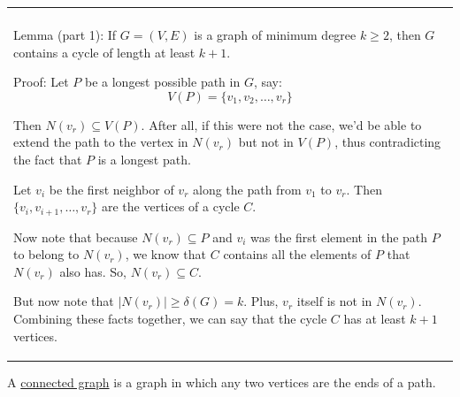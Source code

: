 \documentclass{book}
\newcommand{\hOneOld}{%
   \color{Black}%
   \fontsize{14}{14}\selectfont%
}
\newcommand{\exOneOldd}{%
   \color{Purple}%
   \fontsize{14}{14}\selectfont%
}
\newcommand{\exPOldd}{%
   \color{VioletRed}%
   \fontsize{12}{12}\selectfont%
}
\newenvironment{myConstrict}{%
   \begin{adjustwidth}{2.5em}{2.5em}%
}{%
   \end{adjustwidth}%
}
\newcommand{\udefine}[1]{{%
   \setulcolor{Red}%
   \setul{0.14em}{0.07em}%
   \ul{#1}%
}}
\newcommand{\uuline}[2][.]{%
{\vphantom{a}\color{#1}%
\rlap{\rule[-0.18em]{\widthof{#2}}{0.06em}}%
\rlap{\rule[-0.32em]{\widthof{#2}}{0.06em}}}%
#2}
\newenvironment{myClosureOne}[2][.]{%
   \color{#1}%
   \begin{tabular}{|p{#2in}|} \hline \\%
}{%
   \\ \hline \end{tabular}%
}
\newcommand{\retTwo}{\hfill\bigbreak}
\begin{document}
\exOneOldd
\begin{center}
\begin{myClosureOne}{5.5}
   \uuline{Lemma (part 1)}: If $G = (V, E)$ is a graph of minimum degree
   $k \geq 2$, then $G$ contains a cycle of length at least
   $k + 1$.

   {\exPOldd \begin{myConstrict}
      Proof: Let $P$ be a longest possible path in $G$, say:
      \[V(P) = \{v_1, v_2, \ldots, v_r\}\]

      Then $N(v_r) \subseteq V(P)$. After all, if this were not 
      the case, we'd be able to extend the path to the vertex in 
      $N(v_r)$ but not in $V(P)$, thus contradicting the fact that
      $P$ is a longest path. \retTwo

      Let $v_i$ be the first neighbor of $v_r$ along the path from
      $v_1$ to $v_r$. Then $\{v_i, v_{i+1}, \ldots, v_r\}$ are the
      vertices of a cycle $C$. \retTwo

      Now note that because $N(v_r) \subseteq P$ and $v_i$ was
      the first element in the path $P$ to belong to $N(v_r)$, 
      we know that $C$ contains all the elements of $P$ that 
      $N(v_r)$ also has. So, $N(v_r) \subseteq C$. \retTwo

      But now note that $\lvert N(v_r) \rvert \geq \delta(G)=k$. Plus,
      $v_r$ itself is not in $N(v_r)$. Combining these facts together,
      we can say that the cycle $C$ has at least $k + 1$ vertices.\newline
   \end{myConstrict}}
   
   \uuline{Lemma (part 2)}: The cycle length $k+1$ is the longest 
   we can guarentee based on the minimum degree of the graph being $k$.

   {\exPOldd \begin{myConstrict}
      Proof: Take the graph $K_{k+1}$ which has a minimum degree $k$. 
      \newline
      Obviously, the longest cycle in $K_{k+1}$ is the cycle containing
      all $k+1$ elements of $K_{k+1}$. Thus, we have shown that there
      are graphs with minimum degree $k$ which don't have cycles of
      length greater than \newline $k + 1$.
   \end{myConstrict}} 
\end{myClosureOne}
\end{center}
\retTwo

\hOneOld
A \udefine{connected graph} is a graph in which any two vertices
are the ends of a path. \retTwo
\end{document}
